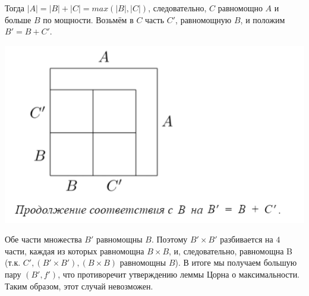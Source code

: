 Тогда $|A| = |B| + |C| = max(|B|, |C|)$, следовательно, $C$ равномощно $A$ и больше $B$ по мощности. Возьмём в $C$ часть $C'$, равномощную $B$, и положим $B' = B + C'$.

\includegraphics{images/2.12 2.png}

Обе части множества $B'$ равномощны $B$. Поэтому $B' \times B'$ разбивается на $4$ части, каждая из которых равномощна $B \times B$, и, следовательно, равномощна B (т.к. $C', (B' \times B'), (B \times B)$  равномощны $B$). В итоге мы получаем большую пару $(B', f')$, что противоречит утверждению леммы Цорна о максимальности. Таким образом, этот случай невозможен.
